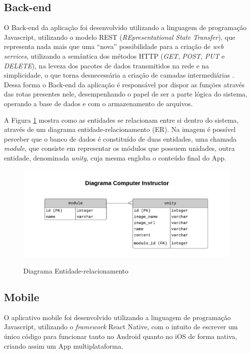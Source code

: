 \subsection{Back-end}
\label{implementacao_back}

O Back-end da aplicação foi desenvolvido utilizando a linguagem de programação Javascript, utilizando o modelo REST (\textit{REpresentational State Transfer}), que representa nada mais que uma “nova” possibilidade para a criação de \textit{web services}, utilizando a semântica dos métodos HTTP (\textit{GET}, \textit{POST}, \textit{PUT} e \textit{DELETE}), na leveza dos pacotes de dados transmitidos na rede e na simplicidade, o que torna desnecessária a criação de camadas intermediárias \cite{devmedia2018}. Dessa forma o Back-end da aplicação é responsável por dispor as funções através das rotas presentes nele, desempenhando o papel de ser a parte lógica do sistema, operando a base de dados e com o armazenamento de arquivos.

A Figura \ref{fig:diagram_entidade_relacionamento} mostra como as entidades se relacionam entre si dentro do sistema, através de um diagrama entidade-relacionamento (ER). Na imagem é possível perceber que o banco de dados é constituído de duas entidades, uma chamada \textit{module}, que consiste em representar os módulos que possuem unidades, outra entidade, denominada \textit{unity}, cuja mesma engloba o conteúdo final do App.

\begin{figure}[H]
    \centering
    \caption{Diagrama Entidade-relacionamento}
    \includegraphics[width=1\textwidth]{figuras/Diagrama ER.png}
    \label{fig:diagram_entidade_relacionamento}
    {}
\end{figure}

\subsection{Mobile}
\label{implementacao_mobile}
O aplicativo mobile foi desenvolvido utilizando a linguagem de programação Javascript, utilizando o \textit{framework} React Native, com o intuito de escrever um único código para funcionar tanto no Android quanto no iOS de forma nativa, criando assim um App multiplataforma.

